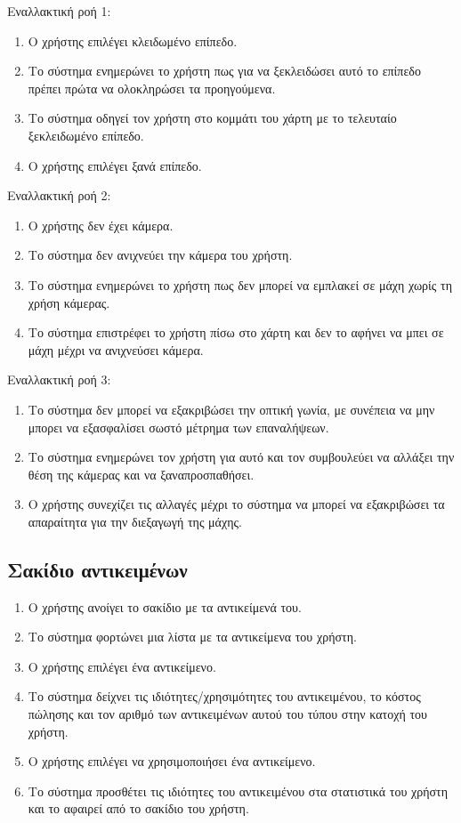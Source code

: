 Εναλλακτική ροή 1: 
\begin{enumerate}[label=3.\alph*.,ref=3.\alph*]
\item Ο χρήστης επιλέγει κλειδωμένο επίπεδο.
\item Το σύστημα ενημερώνει το χρήστη πως για να ξεκλειδώσει αυτό το επίπεδο πρέπει πρώτα να ολοκληρώσει τα προηγούμενα.
\item Το σύστημα οδηγεί τον χρήστη στο κομμάτι του χάρτη με το τελευταίο ξεκλειδωμένο επίπεδο.
\item Ο χρήστης επιλέγει ξανά επίπεδο.
\end{enumerate}


Εναλλακτική ροή 2:
\begin{enumerate}[label=5.\alph*.,ref=5.\alph*]
\item Ο χρήστης δεν έχει κάμερα.
\item Το σύστημα δεν ανιχνεύει την κάμερα του χρήστη.
\item Το σύστημα ενημερώνει το χρήστη πως δεν μπορεί να εμπλακεί σε μάχη χωρίς τη χρήση κάμερας.
\item Το σύστημα επιστρέφει το χρήστη πίσω στο χάρτη και δεν το αφήνει να μπει σε μάχη μέχρι να ανιχνεύσει κάμερα.
\end{enumerate}

Εναλλακτική ροή 3:
\begin{enumerate}[label=7.\alph*.,ref=7.\alph*]
\item Το σύστημα δεν μπορεί να εξακριβώσει την οπτική γωνία, με συνέπεια να μην μπορει να εξασφαλίσει σωστό μέτρημα των επαναλήψεων.
\item Το σύστημα ενημερώνει τον χρήστη για αυτό και τον συμβουλεύει να αλλάξει την θέση της κάμερας και να ξαναπροσπαθήσει. 
\item Ο χρήστης συνεχίζει τις αλλαγές μέχρι το σύστημα να μπορεί να εξακριβώσει τα απαραίτητα για την διεξαγωγή της μάχης.
\end{enumerate}

\newpage
\subsection{Σακίδιο αντικειμένων}
\label{sec:backpack}
\begin{enumerate}
\item Ο χρήστης ανοίγει το σακίδιο με τα αντικείμενά του.
\item Το σύστημα φορτώνει μια λίστα με τα αντικείμενα του χρήστη.
\item Ο χρήστης επιλέγει ένα αντικείμενο.
\item Το σύστημα δείχνει τις ιδιότητες/χρησιμότητες του αντικειμένου, το κόστος πώλησης και τον αριθμό των αντικειμένων αυτού του τύπου στην κατοχή του χρήστη.
\item Ο χρήστης επιλέγει να χρησιμοποιήσει ένα αντικείμενο.
\item Το σύστημα προσθέτει τις ιδιότητες του αντικειμένου στα στατιστικά του χρήστη και το αφαιρεί από το σακίδιο του χρήστη.
\end{enumerate}

